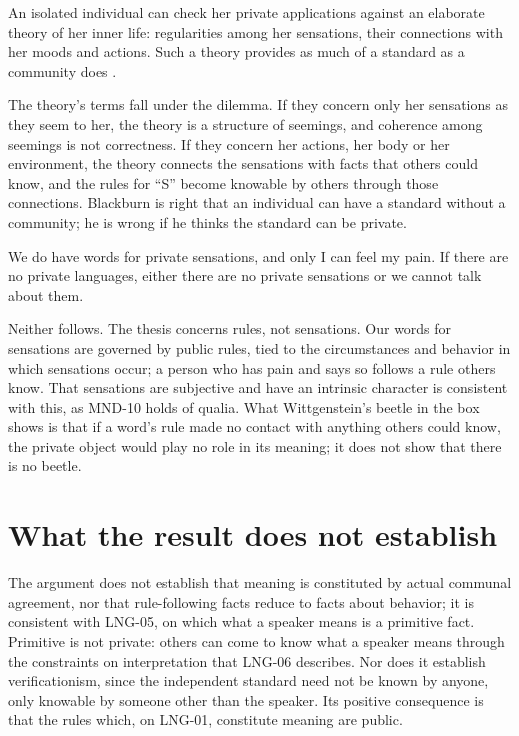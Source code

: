 \documentclass{situationist-preprint}
\begin{document}
\begin{objection}[Theory]
An isolated individual can check her private applications against an elaborate theory of her inner life: regularities among her sensations, their connections with her moods and actions. Such a theory provides as much of a standard as a community does \citep{Blackburn1984}.
\end{objection}

\begin{reply}
The theory's terms fall under the dilemma. If they concern only her sensations as they seem to her, the theory is a structure of seemings, and coherence among seemings is not correctness. If they concern her actions, her body or her environment, the theory connects the sensations with facts that others could know, and the rules for \enquote{S} become knowable by others through those connections. Blackburn is right that an individual can have a standard without a community; he is wrong if he thinks the standard can be private.
\end{reply}

\begin{objection}[Sensations]
We do have words for private sensations, and only I can feel my pain. If there are no private languages, either there are no private sensations or we cannot talk about them.
\end{objection}

\begin{reply}
Neither follows. The thesis concerns rules, not sensations. Our words for sensations are governed by public rules, tied to the circumstances and behavior in which sensations occur; a person who has pain and says so follows a rule others know. That sensations are subjective and have an intrinsic character is consistent with this, as MND-10 holds of qualia. What Wittgenstein's beetle in the box shows \citep[\S293]{Wittgenstein1953} is that if a word's rule made no contact with anything others could know, the private object would play no role in its meaning; it does not show that there is no beetle.
\end{reply}

\section{What the result does not establish}

The argument does not establish that meaning is constituted by actual communal agreement, nor that rule-following facts reduce to facts about behavior; it is consistent with LNG-05, on which what a speaker means is a primitive fact. Primitive is not private: others can come to know what a speaker means through the constraints on interpretation that LNG-06 describes. Nor does it establish verificationism, since the independent standard need not be known by anyone, only knowable by someone other than the speaker. Its positive consequence is that the rules which, on LNG-01, constitute meaning are public.
\end{document}
